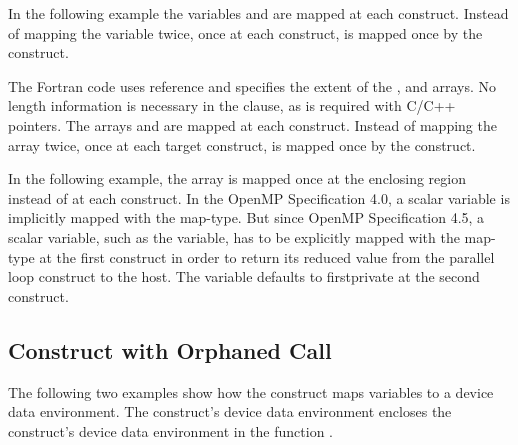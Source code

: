 In the following example the variables  and  are mapped at each  
construct. Instead of mapping the variable  twice, once at each  
construct,  is mapped once by the  construct.



The Fortran code uses reference and specifies the extent of the ,  and  arrays. 
No length information is necessary in the  clause, as is required with 
C/C++ pointers. The arrays  and  are mapped at each  construct. 
Instead of mapping the array  twice, once at each target construct,  is mapped 
once by the  construct.


In the following example, the array  is mapped once at the enclosing 
 region instead of at each  construct.
In the OpenMP Specification 4.0, a scalar variable is implicitly mapped with the  map-type.
But since OpenMP Specification 4.5, a scalar variable, such as the  variable, has to be explicitly mapped with
the  map-type at the first  construct in order to return 
its reduced value from the parallel loop construct to the host.
The variable defaults to firstprivate at the second  construct.



\subsection{ Construct with Orphaned Call}

The following two examples show how the  construct
maps variables to a device data environment. The 
construct's device data environment encloses the  construct's device 
data environment in the function .

